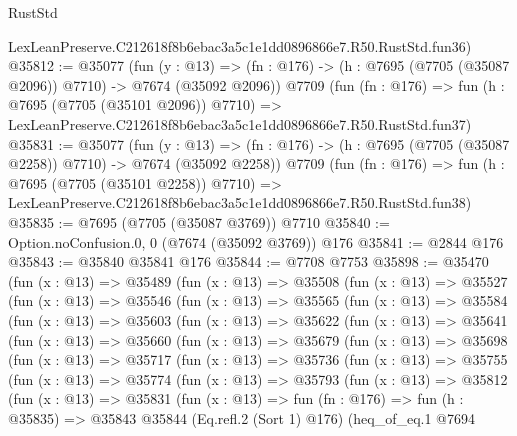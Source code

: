 \begin{lexlean}{RustStd}
\begin{coremodule}
    LexLeanPreserve.C212618f8b6ebac3a5c1e1dd0896866e7.R50.RustStd.fun36)
@35812 := @35077
    (fun (y : @13) =>
    (fn : @176) -> (h : @7695 (@7705 (@35087 @2096)) @7710) -> @7674 (@35092 @2096))
    @7709
    (fun (fn : @176) =>
    fun (h : @7695 (@7705 (@35101 @2096)) @7710) =>
    LexLeanPreserve.C212618f8b6ebac3a5c1e1dd0896866e7.R50.RustStd.fun37)
@35831 := @35077
    (fun (y : @13) =>
    (fn : @176) -> (h : @7695 (@7705 (@35087 @2258)) @7710) -> @7674 (@35092 @2258))
    @7709
    (fun (fn : @176) =>
    fun (h : @7695 (@7705 (@35101 @2258)) @7710) =>
    LexLeanPreserve.C212618f8b6ebac3a5c1e1dd0896866e7.R50.RustStd.fun38)
@35835 := @7695 (@7705 (@35087 @3769)) @7710
@35840 := Option.noConfusion.{0, 0} (@7674 (@35092 @3769)) @176
@35841 := @2844 @176
@35843 := @35840 @35841 @176
@35844 := @7708 @7753
@35898 := @35470
    (fun (x : @13) =>
    @35489
      (fun (x : @13) =>
      @35508
        (fun (x : @13) =>
        @35527
          (fun (x : @13) =>
          @35546
            (fun (x : @13) =>
            @35565
              (fun (x : @13) =>
              @35584
                (fun (x : @13) =>
                @35603
                  (fun (x : @13) =>
                  @35622
                    (fun (x : @13) =>
                    @35641
                      (fun (x : @13) =>
                      @35660
                        (fun (x : @13) =>
                        @35679
                          (fun (x : @13) =>
                          @35698
                            (fun (x : @13) =>
                            @35717
                              (fun (x : @13) =>
                              @35736
                                (fun (x : @13) =>
                                @35755
                                  (fun (x : @13) =>
                                  @35774
                                    (fun (x : @13) =>
                                    @35793
                                      (fun (x : @13) =>
                                      @35812
                                        (fun (x : @13) =>
                                        @35831
                                          (fun (x : @13) =>
                                          fun (fn : @176) =>
                                          fun (h : @35835) =>
                                          @35843
                                            @35844
                                            (Eq.refl.{2} (Sort 1) @176)
                                            (heq_of_eq.{1}
                                              @7694

\end{coremodule}
\end{lexlean}
